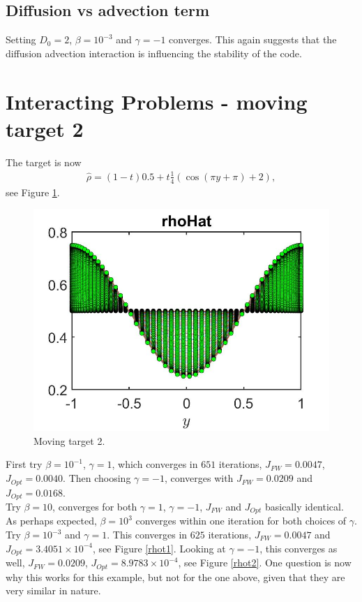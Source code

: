 \documentclass[11pt, a4paper]{article}
\theoremstyle{definition}
\begin{document}
\subsection{Diffusion vs advection term}
Setting $D_0=2$, $\beta = 10^{-3}$ and $\gamma = -1$ converges. This again suggests that the diffusion advection interaction is influencing the stability of the code.


\section{Interacting Problems - moving target 2}
The target is now
\begin{align*}
\hat \rho = (1-t)0.5 + t\frac{1}{4}(\cos(\pi y + \pi) + 2),
\end{align*}
see Figure \ref{rhoHat4}.
\begin{figure}[h]
	\includegraphics[scale=0.3]{rhoHat4.jpg}
	\caption{Moving target 2.}
	\label{rhoHat4}
\end{figure}

First try $\beta = 10^{-1}$, $\gamma = 1$, which converges in $651$ iterations, $J_{FW} = 0.0047$, $J_{Opt} = 0.0040$. Then choosing $\gamma = -1$, converges with $J_{FW} = 0.0209$ and $J_{Opt} = 0.0168$.\\
Try $\beta = 10$, converges for both $\gamma =1$, $\gamma = -1$, $J_{FW}$ and $J_{Opt}$ basically identical. As perhaps expected, $\beta = 10^3$ converges within one iteration for both choices of $\gamma$.\\
Try $\beta = 10^{-3}$ and $\gamma = 1$. This converges in $625$ iterations, $J_{FW} = 0.0047$ and $J_{Opt} = 3.4051 \times 10^{-4}$, see Figure \ref{rhot1}.
Looking at $\gamma = -1$, this converges as well, $J_{FW} = 0.0209$, $J_{Opt} = 8.9783 \times 10^{-4}$, see Figure \ref{rhot2}. One question is now why this works for this example, but not for the one above, given that they are very similar in nature.\\
\end{document}
